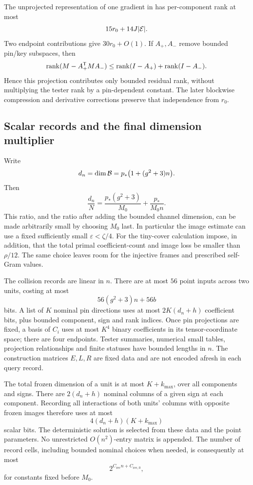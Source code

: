 The unprojected representation of one gradient in
 has per-component rank at most
\[
                         15r_0+14J|\mathcal E|.
\]
Two endpoint contributions give \(30r_0+O(1)\).
If \(A_+,A_-\) remove bounded pin/key subspaces, then
\[
 \operatorname{rank}(M-A_+^{\mathsf T} M A_-)
       \le\operatorname{rank}(I-A_+)+\operatorname{rank}(I-A_-).
\]
Hence this projection contributes only bounded residual rank,
without multiplying the tester rank by a pin-dependent constant.
The later blockwise compression and derivative corrections preserve
that independence from \(r_0\).

\subsection{Scalar records and the final dimension multiplier}

Write
\begin{equation}
                  d_n=\dim\mathcal B=p_*\bigl(1+(g^2+3)n\bigr).
 \label{eq:ledger-column-dimension}
\end{equation}
Then
\[
       \frac{d_n}{N}
       =\frac{p_*(g^2+3)}{M_0}+\frac{p_*}{M_0n}.
\]
This ratio, and the ratio after adding the bounded channel dimension,
can be made arbitrarily small by choosing \(M_0\) last.
In particular the image estimate can use a fixed sufficiently small
\(\varepsilon<\zeta/4\).  For the tiny-cover calculation impose,
in addition, that the total primal coefficient-count and image
loss be smaller than \(\rho/12\).  The same choice leaves room
for the injective frames and prescribed self-Gram values.

The collision records are linear in \(n\).
There are at most \(56\) point inputs across two units, costing at most
\[
                         56(g^2+3)n+56b
\]
bits. A list of \(K\) nominal pin directions uses at most
\(2K(d_n+h)\) coefficient bits, plus bounded component, sign and rank
indices.
Once pin projections are fixed, a basis of \(C_i\) uses at most
\(K^4\) binary coefficients in its tensor-coordinate space;
there are four endpoints.
Tester summaries, numerical small tables, projection relationships
and finite statuses have bounded lengths in \(n\).
The construction matrices \(E,L,R\) are fixed data and are not
encoded afresh in each query record.

The total frozen dimension of a unit is at most \(K+k_{\max}\),
over all components and signs.
There are \(2(d_n+h)\) nominal columns of a given sign at each
component. Recording all interactions of both units' columns with
opposite frozen images therefore uses at most
\[
                         4(d_n+h)(K+k_{\max})
\]
scalar bits.
The deterministic solution is selected from these data and the point
parameters. No unrestricted \(O(n^2)\)-entry matrix is appended.
The number of record cells, including bounded nominal choices when
needed, is consequently at most
\begin{equation}
                         2^{C_{\mathrm{rec}}n+C_{\mathrm{rec},0}},
 \label{eq:ledger-record-count}
\end{equation}
for constants fixed before \(M_0\).

